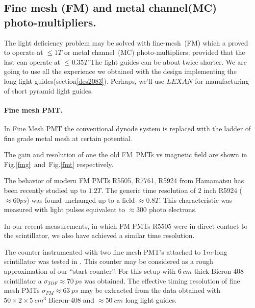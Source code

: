 \subsection{Fine mesh (FM) and metal channel(MC) photo-multipliers.}
\label{fimemech}
The light deficiency  
problem may be solved with fine-mesh~(FM) 
which a proved to operate at $\leq1T$ or metal channel~(MC) 
 photo-multipliers, provided that the last can operate at $\leq0.35T$ 
  The light guides can be about 
twice shorter. We are going to use all the 
experience we obtained with the  design implementing the  long light guides(section\ref{des2083}). 
Perhaps, 
 we'll use 
$LEXAN$ for manufacturing of short pyramid light guides.



\paragraph{Fine mesh PMT.}
In Fine Mesh PMT the conventional dynode system is replaced 
with  the ladder  of fine grade metal mesh at certain potential.


 The gain and resolution\cite{kich} of one the old  FM~PMTs vs magnetic field are  shown in 
Fig.\ref{fmg}~and~Fig.\ref{fmt} respectively.

The behavior of modern FM PMTs R5505, R7761, R5924 from Hamamatsu
has been recently studied up to $1.2T$\cite{fmtr01}.
 The generic time resolution of 2 inch R5924  ($\approx60ps$)
was found unchanged
 up to a field  $\approx0.8T$. This characteristic was measured
with  light  pulses equivalent to $\approx300$ photo electrons.

 In our recent measurements, in which  FM PMTs R5505 were  
in direct contact to the scintillator, we also  have achieved 
a similar  time resolution\cite{kuznetsov}. 




The  counter instrumented with  two fine mesh PMT's attached to $1m$-long scintillator 
was tested in \cite{foucher}.
This counter   may be considered as a rough approximation of our
 ``start-counter''.
For this  setup\cite{foucher}  with  $6~cm$ thick Bicron-408 scintillator 
a  $\sigma_{TOF}\approx 70~ps$ was obtained.
The effective  timing resolution of fine mesh  PMTs   
$\sigma_{FM}\approx 63~ps$ may be 
extracted  from the data obtained\cite{csn1} with  $50\times2\times 5~cm^3$ 
 Bicron-408 and $\approx 50~cm$ long  light guides.

